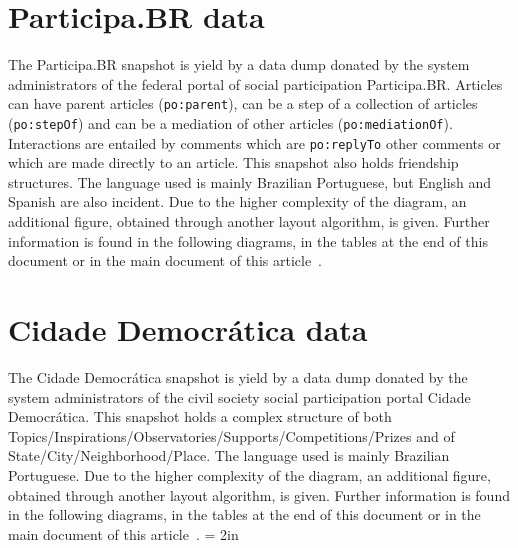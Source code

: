\documentclass[review]{elsarticle}
\newcommand{\te}[1] {\texttt{\footnotesize#1}}
\begin{document}
\section{Participa.BR data}
The Participa.BR snapshot is yield by a data dump donated by the system
administrators of the federal portal of social participation Participa.BR.
Articles can have parent articles (\te{po:parent}), can be a step of a
collection of articles (\te{po:stepOf}) and can be a mediation of other
articles (\te{po:mediationOf}).
Interactions are entailed by comments which are \te{po:replyTo} other
comments or which are made directly to an article.
This snapshot also holds friendship structures.
The language used is mainly Brazilian Portuguese, but English and
Spanish are also incident.
Due to the higher complexity of the diagram, an additional figure,
obtained through another layout algorithm, is given.
Further information is found in the following diagrams, in the tables at 
the end of this document or in the main document of this article~\cite{losd}.

\section{Cidade Democrática data}
The Cidade Democrática snapshot is yield by a data dump donated by the system
administrators of the civil society social participation portal Cidade
Democrática.
This snapshot holds a complex structure of both
Topics/Inspirations/Observatories/Supports/Competitions/Prizes
and of State/City/Neighborhood/Place.
The language used is mainly Brazilian Portuguese.
Due to the higher complexity of the diagram, an additional figure,
obtained through another layout algorithm, is given.
Further information is found in the following diagrams, in the tables at
the end of this document or in the main document of this article~\cite{losd}.
\textheight = 2in
\pdfpageheight 5in
\end{document}

